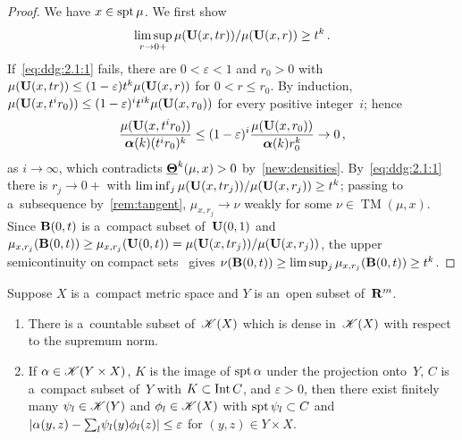 \documentclass[a4paper,twoside,leqno]{article}
\DeclareMathOperator{\TM}{TM}                   %
\begin{document}
\begin{proof}
    We have $x \in \operatorname{spt} \mu$. We first show
    \begin{equation}
        \label{eq:ddg:2.1:1}
        \limsup_{r \to 0+} \mu(\mathbf{U}(x,tr)) / \mu(\mathbf{U}(x,r)) \ge t^{k} \,.
    \end{equation}
    If~\eqref{eq:ddg:2.1:1} fails, there are $0 < \varepsilon < 1$ and $r_0 > 0$ with
    $\mu(\mathbf{U}(x,tr)) \le (1-\varepsilon) t^{k} \mu(\mathbf{U}(x,r))$ for $0 < r \le r_0$. By
    induction, $\mu(\mathbf{U}(x,t^i r_0)) \le (1 - \varepsilon)^i t^{ik} \mu(\mathbf{U}(x,r_0))$
    for every positive integer~$i$; hence
    \begin{displaymath}
        \frac{\mu(\mathbf{U}(x,t^i r_0))}{\boldsymbol{\alpha}(k) (t^i r_0)^{k}} \le (1 -
        \varepsilon)^i \frac{\mu(\mathbf{U}(x,r_0))}{\boldsymbol{\alpha}(k) r_0^{k}} \to 0 \,,
    \end{displaymath}
    as $i \to \infty$,
    which contradicts $\boldsymbol{\underline{\Theta}}^{k}(\mu,x) > 0$ by~\ref{new:densities}. By~\eqref{eq:ddg:2.1:1}
    there is $r_j \to 0+$ with $\liminf_j \mu(\mathbf{U}(x,t r_j)) / \mu(\mathbf{U}(x,r_j)) \ge
    t^{k}$; passing to a~subsequence by~\ref{rem:tangent}, $\mu_{x,r_j} \to \nu$ weakly for
    some $\nu \in \TM(\mu,x)$. Since $\mathbf{B}(0,t)$ is a~compact subset of~$\mathbf{U}(0,1)$ and
    $\mu_{x,r_j}(\mathbf{B}(0,t)) \ge \mu_{x,r_j}(\mathbf{U}(0,t)) = \mu(\mathbf{U}(x,tr_j)) /
    \mu(\mathbf{U}(x,r_j))$, the upper semicontinuity on compact sets~\cite[2.6(2)(c)]{Allard1972}
    gives $\nu(\mathbf{B}(0,t)) \ge \limsup_j \mu_{x,r_j}(\mathbf{B}(0,t)) \ge t^{k}$.
\end{proof}

\begin{lemma}[new]
    \label{new:approx}
    Suppose $X$ is a~compact metric space and $Y$ is an~open subset of~$\mathbf{R}^m$.
    \begin{enumerate}
        \item
        \label{i:new:approx:sep}
        There is a~countable subset of~$\mathscr{K}(X)$ which is dense in~$\mathscr{K}(X)$ with respect
        to the supremum norm.
        \item
        \label{i:new:approx:prod}
        If $\alpha \in \mathscr{K}(Y \times X)$, $K$ is the image of $\operatorname{spt} \alpha$ under the
        projection onto~$Y$, $C$ is a~compact subset of~$Y$ with $K \subset \operatorname{Int} C$, and
        $\varepsilon > 0$, then there exist finitely many $\psi_l \in \mathscr{K}(Y)$ and $\phi_l \in
        \mathscr{K}(X)$ with $\operatorname{spt} \psi_l \subset C$ and
        $|\alpha(y,z) - {\textstyle\sum_{l}^{}} \psi_l(y) \phi_l(z)| \le \varepsilon$ for $(y,z) \in Y \times
        X$.
    \end{enumerate}
\end{lemma}
\end{document}
